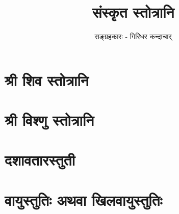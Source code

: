 \documentclass[twoside,a5paper]{report}
\title{\Huge \sanskrit संस्कृत स्तोत्रानि}
\author{\small \sanskrit सङ्ग्रहकारः - गिरिधर कन्दाचार्}
\newcommand*\NewPage{\newpage\null\thispagestyle{empty}\newpage}
\begin{document}
\maketitle
\NewPage
{}
\tableofcontents
{}

\chapter{\color{orange}\sanskrit श्री शिव स्तोत्रानि }


\chapter{\color{orange}\sanskrit श्री विश्णु स्तोत्रानि }


\chapter{\color{orange}\sanskrit दशावतारस्तुती }


\chapter{\color{orange}\sanskrit वायुस्तुतिः अथवा खिलवायुस्तुतिः  }

\end{document}
